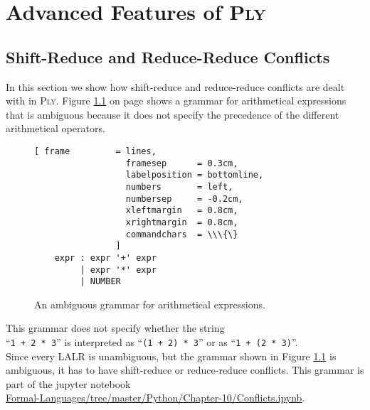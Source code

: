 \chapter{Advanced Features of \textsc{Ply}}

\section{Shift-Reduce and Reduce-Reduce Conflicts}
In this section we show how shift-reduce and reduce-reduce conflicts are dealt with in \textsc{Ply}.
Figure \ref{fig:Conflicts.ipynb} on page \pageref{fig:Conflicts.ipynb} shows a grammar for arithmetical
expressions that is ambiguous because it does not specify the precedence of the different arithmetical
operators.  


\begin{figure}[!ht]
\centering
\begin{Verbatim}[ frame         = lines, 
                  framesep      = 0.3cm, 
                  labelposition = bottomline,
                  numbers       = left,
                  numbersep     = -0.2cm,
                  xleftmargin   = 0.8cm,
                  xrightmargin  = 0.8cm,
                  commandchars  = \\\{\}
                ]
    expr : expr '+' expr
         | expr '*' expr
         | NUMBER      
\end{Verbatim}
\vspace*{-0.3cm}
\caption{An ambiguous grammar for arithmetical expressions.}
\label{fig:Conflicts.ipynb}
\end{figure}
\FloatBarrier

\noindent
This grammar does not specify whether the string
\\[0.2cm]
\hspace*{1.3cm} 
``\texttt{1 + 2 * 3}'' \quad is interpreted as \quad  ``\texttt{(1 + 2) * 3}'' \quad or as \quad ``\texttt{1 +
  (2 * 3)}''. 
\\[0.2cm]
Since every LALR is unambiguous, but the grammar shown in Figure \ref{fig:Conflicts.ipynb} is ambiguous,  it
has to have shift-reduce or reduce-reduce conflicts.  This grammar is part of the jupyter notebook 
\\[0.2cm]
\hspace*{1.3cm}
\href{https://github.com/karlstroetmann/Formal-Languages/tree/master/Python/Chapter-10/Conflicts.ipynb}{Formal-Languages/tree/master/Python/Chapter-10/Conflicts.ipynb}.


